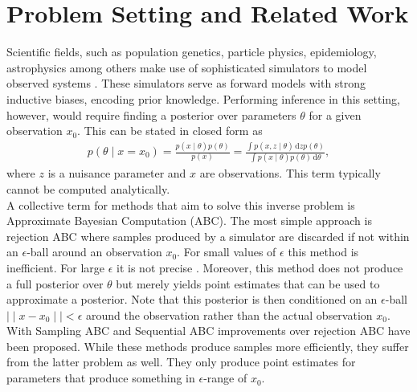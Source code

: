 \documentclass[12pt]{article}
\title{\vskip-3em \bf 
	Simulation-based Inference
    }
\author{
    A Summary Written by Stefan Wezel \\
    \texttt{stefan.wezel@student.uni-tuebingen.de}
}
\date{\it Machine Learning for and with Dynamical Systems\\Summer Term 2021}
\newcommand{\diff}{\,\text{d}}
\begin{document}
\maketitle



\section*{Problem Setting and Related Work}
Scientific fields, such as population genetics, particle physics, epidemiology, astrophysics among others make use of sophisticated simulators to model observed systems \citep{brehmer2020simulation, de2020simulation, delaunoy2020lightning,cranmer2020frontier, pritchard1999population}. These simulators serve as forward models with strong inductive biases, encoding prior knowledge. Performing inference in this setting, however, would require finding a posterior over parameters $\theta$ for a given observation $x_0$. This can be stated in closed form as 
\begin{align}
	p(\theta\mid x=x_0) = \frac{p(x\mid \theta)p(\theta)}{p(x)} = \frac{\int p(x,z\mid \theta)\diff z p(\theta)}{\int p(x\mid \theta)p(\theta) \diff \theta},
\end{align}
where $z$ is a nuisance parameter and $x$ are observations. This term typically cannot be computed analytically.\\
A collective term for methods that aim to solve this inverse problem is Approximate Bayesian Computation (ABC). The most simple approach is rejection ABC \citep{pritchard1999population} where samples produced by a simulator are discarded if not within an $\epsilon$-ball around an observation $x_0$. For small values of $\epsilon$ this method is inefficient. For large $\epsilon$ it is not precise \citep{papamakarios2016fast}. Moreover, this method does not produce a full posterior over $\theta$ but merely yields point estimates that can be used to approximate a posterior. Note that this posterior is then conditioned on an $\epsilon$-ball $\mid\mid x-x_0 \mid\mid < \epsilon$ around the observation rather than the actual observation $x_0$. With Sampling ABC \citep{marjoram2003markov} and Sequential ABC \citep{beaumont2009adaptive,bonassi2015sequential} improvements over rejection ABC have been proposed. While these methods produce samples more efficiently, they suffer from the latter problem as well. They only produce point estimates for parameters that produce something in $\epsilon$-range of $x_0$.
\end{document}
